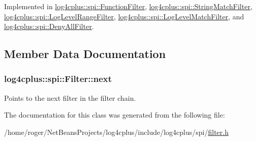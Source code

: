 Implemented in \hyperlink{classlog4cplus_1_1spi_1_1FunctionFilter_a0c68a83fdb63980ec7da8419988e1e81}{log4cplus\-::spi\-::\-Function\-Filter}, \hyperlink{classlog4cplus_1_1spi_1_1StringMatchFilter_a6b9f1b930b9a045ff668aae689e798bb}{log4cplus\-::spi\-::\-String\-Match\-Filter}, \hyperlink{classlog4cplus_1_1spi_1_1LogLevelRangeFilter_a5c22fc312173f06abd729961933f30c8}{log4cplus\-::spi\-::\-Log\-Level\-Range\-Filter}, \hyperlink{classlog4cplus_1_1spi_1_1LogLevelMatchFilter_ab9d292692d09079ce2baeb4c7d40df92}{log4cplus\-::spi\-::\-Log\-Level\-Match\-Filter}, and \hyperlink{classlog4cplus_1_1spi_1_1DenyAllFilter_ac6952edfd99def7e84b9e90315782f64}{log4cplus\-::spi\-::\-Deny\-All\-Filter}.



\subsection{Member Data Documentation}
\hypertarget{classlog4cplus_1_1spi_1_1Filter_ac78a9de8a5b0536fdb165fbb40af9504}{
\subsubsection[{next}]{ log4cplus\-::spi\-::\-Filter\-::next}}\label{classlog4cplus_1_1spi_1_1Filter_ac78a9de8a5b0536fdb165fbb40af9504}
Points to the next filter in the filter chain. 

The documentation for this class was generated from the following file\-:\begin{DoxyCompactItemize}
\item 
/home/roger/\-Net\-Beans\-Projects/log4cplus/include/log4cplus/spi/\hyperlink{filter_8h}{filter.\-h}\end{DoxyCompactItemize}
